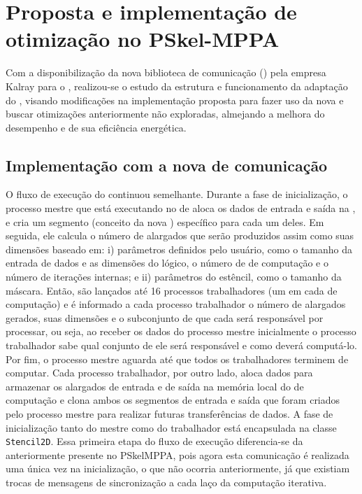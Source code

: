 %

\chapter{Proposta e implementação de otimização no PSkel-MPPA}
\label{cap:pskelMPPA}

Com a disponibilização da nova biblioteca de comunicação (\async) pela empresa Kalray para o \mppa, realizou-se o estudo da estrutura e funcionamento da adaptação do \pskelmppa, visando modificações na implementação proposta para fazer uso da nova \api e buscar otimizações anteriormente não exploradas, almejando a melhora do desempenho e de sua eficiência energética.

\section{Implementação com a nova \api de comunicação \async}
\label{sec:implementacao-async}

O fluxo de execução do \pskelmppa continuou semelhante. Durante a fase de inicialização, o processo mestre que está executando no \cluster de \io aloca os dados de entrada e saída na \lpddr, e cria um segmento (conceito da nova \api) específico para cada um deles. Em seguida, ele calcula o número de \tiles alargados que serão produzidos assim como suas dimensões baseado em: i) parâmetros definidos pelo usuário, como o tamanho da entrada de dados e as dimensões do \tile lógico, o número de \clusters de computação e o número de iterações internas; e ii) parâmetros do  estêncil, como o tamanho da máscara. Então, são lançados até 16 processos trabalhadores (um em cada \cluster de computação) e é informado a cada processo trabalhador o número de \tiles alargados gerados, suas dimensões e o subconjunto de \tiles que cada \cluster será responsável por processar, ou seja, ao receber os dados do processo mestre inicialmente o processo trabalhador sabe qual conjunto de \tiles ele será responsável e como deverá computá-lo. Por fim, o processo mestre aguarda até que todos os trabalhadores terminem de computar.
%
Cada processo trabalhador, por outro lado, aloca dados para armazenar os \tiles alargados de entrada e de saída na memória local do \cluster de computação e clona ambos os segmentos de entrada e saída que foram criados pelo processo mestre para realizar futuras transferências de dados. A fase de inicialização tanto do mestre como do trabalhador está encapsulada na classe \texttt{Stencil2D}.
%
Essa primeira etapa do fluxo de execução diferencia-se da anteriormente presente no PSkelMPPA, pois agora esta comunicação é realizada uma única vez na inicialização, o que não ocorria anteriormente, já que existiam trocas de mensagens de sincronização a cada laço da computação iterativa.


